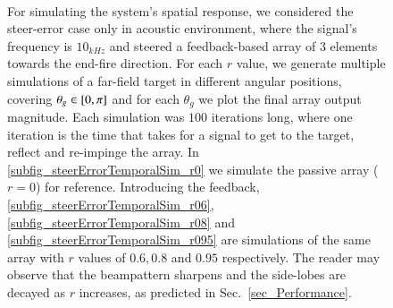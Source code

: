 \documentclass[journal]{IEEEtran}
\begin{document}
\begin{figure}[t!]
   \centering
   \quad
   \\
   \quad
   \caption{For simulating the system's spatial response, we considered the steer-error case only in acoustic environment, where the signal's frequency is $10_{kHz}$ and steered a feedback-based array of $3$ elements towards the end-fire direction. For each $r$ value, we generate multiple simulations of a far-field target in different angular positions, covering $\theta_{g}\in\left[{0,\pi}\right]$ and for each $\theta_{g}$ we plot the final array output magnitude. Each simulation was $100$ iterations long, where one iteration is the time that takes for a signal to get to the target, reflect and re-impinge the array. In \ref{subfig_steerErrorTemporalSim_r0} we simulate the passive array ($r=0$) for reference. Introducing the feedback, \ref{subfig_steerErrorTemporalSim_r06},\ref{subfig_steerErrorTemporalSim_r08} and \ref{subfig_steerErrorTemporalSim_r095} are simulations of the same array with $r$ values of $0.6, 0.8$ and $0.95$ respectively. The reader may observe that the beampattern sharpens and the side-lobes are decayed as $r$ increases, as predicted in Sec.~\ref{sec_Performance}.}
   \label{fig_steerErrorTemporalSim}
\end{figure}
\end{document}
